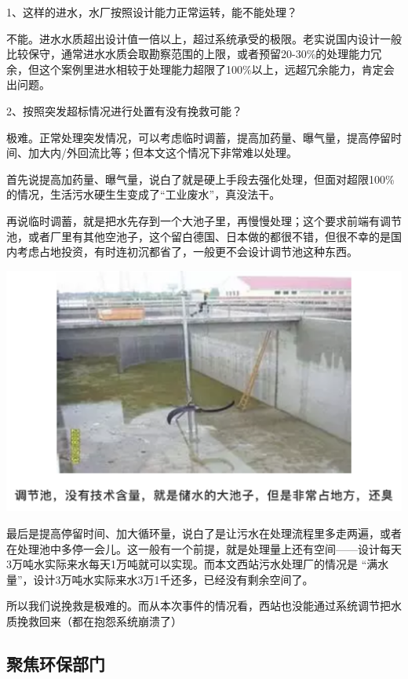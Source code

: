 \documentclass[]{book}
\begin{document}
1、这样的进水，水厂按照设计能力正常运转，能不能处理？

不能。进水水质超出设计值一倍以上，超过系统承受的极限。老实说国内设计一般比较保守，通常进水水质会取勘察范围的上限，或者预留20-30\%的处理能力冗余，但这个案例里进水相较于处理能力超限了100\%以上，远超冗余能力，肯定会出问题。

2、按照突发超标情况进行处置有没有挽救可能？

极难。正常处理突发情况，可以考虑临时调蓄，提高加药量、曝气量，提高停留时间、加大内/外回流比等；但本文这个情况下非常难以处理。

首先说提高加药量、曝气量，说白了就是硬上手段去强化处理，但面对超限100\%的情况，生活污水硬生生变成了``工业废水''，真没法干。

再说临时调蓄，就是把水先存到一个大池子里，再慢慢处理；这个要求前端有调节池，或者厂里有其他空池子，这个留白德国、日本做的都很不错，但很不幸的是国内考虑占地投资，有时连初沉都省了，一般更不会设计调节池这种东西。

\includegraphics[width=6.67in]{images/py1}

最后是提高停留时间、加大循环量，说白了是让污水在处理流程里多走两遍，或者在处理池中多停一会儿。这一般有一个前提，就是处理量上还有空间------设计每天3万吨水实际来水每天1万吨就可以实现。而本文西站污水处理厂的情况是 ``满水量''，设计3万吨水实际来水3万1千还多，已经没有剩余空间了。

所以我们说挽救是极难的。而从本次事件的情况看，西站也没能通过系统调节把水质挽救回来（都在抱怨系统崩溃了）

\hypertarget{ux805aux7126ux73afux4fddux90e8ux95e8}{%
\subsection{聚焦环保部门}\label{ux805aux7126ux73afux4fddux90e8ux95e8}}
\end{document}
